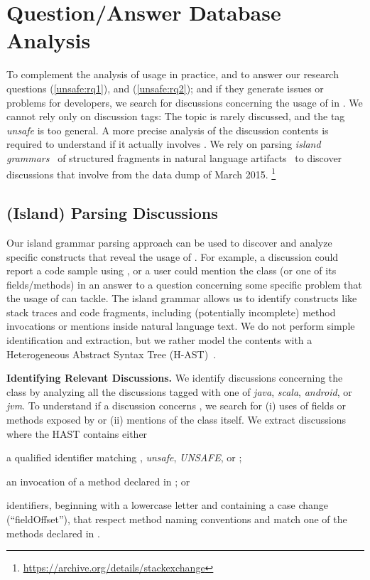 \section{Question/Answer Database Analysis}
\label{sec:unsafe:so}

To complement the analysis of \smu{} usage in practice,
and to answer our research questions \emph{\urqA} (\ref{unsafe:rq1}), and
\emph{\urqB} (\ref{unsafe:rq2});
and if they generate issues or problems for developers,
we search for discussions concerning the usage of \smu{} in \stackoverflow{}.
We cannot rely only on \stackoverflow{} discussion tags:
The topic is rarely discussed,
and the tag \emph{unsafe} is too general.
A more precise analysis of the discussion contents is required to understand if it actually involves \smu{}.
We rely on parsing \emph{island grammars}~\cite{Moon2001a} of structured fragments in natural language artifacts~\cite{Bacc2011f,Ponz2015a} to discover discussions that involve \smu{} from the \stackoverflow{} data dump of March 2015.%
\footnote{\url{https://archive.org/details/stackexchange}}

\subsection{(Island) Parsing \stackoverflow{} Discussions}

Our island grammar parsing approach can be used to discover and analyze specific constructs that reveal the usage of \smu{}.
For example, a discussion could report a code sample using \smu{},
or a user could mention the class (or one of its fields/methods) in an answer to a question concerning some specific problem that the usage of \smu{} can tackle.
The island grammar allows us to identify constructs like stack traces and \java{} code fragments,
including (potentially incomplete) method invocations or mentions inside natural language text.
We do not perform simple identification and extraction,
but we rather model the contents with a Heterogeneous Abstract Syntax Tree (H-AST)~\cite{Ponz2015a}.

\textbf{Identifying Relevant Discussions.}
We identify \stackoverflow{} discussions concerning the \smu{} class by analyzing all the discussions tagged with one of \emph{java}, \emph{scala}, \emph{android}, or \emph{jvm}.
To understand if a discussion concerns \smu{}, we search for
(i) uses of fields or methods exposed by \unsafe{} or
(ii) mentions of the class itself.
We extract discussions where the HAST contains either
\begin{inparaenum}[(i)]
\item a qualified identifier matching  \unsafe{}, \emph{unsafe}, \emph{UNSAFE}, or \smu{};
\item an invocation of a method declared in \smu; or
\item \java{} identifiers, beginning with a lowercase letter and containing a case change (\eg ``fieldOffset''), that respect method naming conventions and match one of the methods declared in \unsafe{}.
\end{inparaenum}

